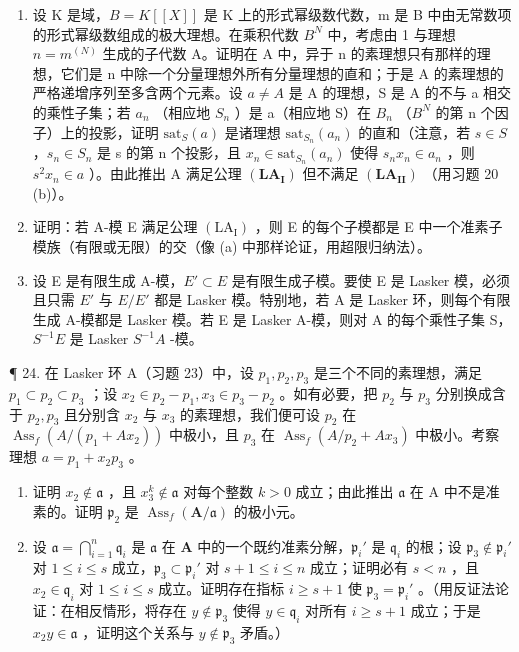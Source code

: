 \begin{enumerate}
\def\labelenumi{(\alph{enumi})}
\setcounter{enumi}{2}
\item
  设 K 是域，\(B = K[[X]]\) 是 K 上的形式幂级数代数，m 是 B 中由无常数项的形式幂级数组成的极大理想。在乘积代数 \(B^{N}\) 中，考虑由 1 与理想 \(n = m^{(N)}\) 生成的子代数 A。证明在 A 中，异于 n 的素理想只有那样的理想，它们是 n 中除一个分量理想外所有分量理想的直和；于是 A 的素理想的严格递增序列至多含两个元素。设 \(a \neq A\) 是 A 的理想，S 是 A 的不与 a 相交的乘性子集；若 \(a_{n}\) （相应地 \(S_{n}\) ）是 a（相应地 S）在 \(B_{n}\) （\(B^{N}\) 的第 n 个因子）上的投影，证明 \(\text{sat}_{S}(a)\) 是诸理想 \(\text{sat}_{S_{n}}(a_{n})\) 的直和（注意，若 \(s \in S\) ，\(s_{n} \in S_{n}\) 是 s 的第 n 个投影，且 \(x_{n} \in \text{sat}_{S_{n}}(a_{n})\) 使得 \(s_{n}x_{n} \in a_{n}\) ，则 \(s^{2}x_{n} \in a\) ）。由此推出 A 满足公理 \((\mathbf{LA}_{\mathbf{I}})\) 但不满足 \((\mathbf{LA}_{\mathbf{II}})\) （用习题 20 (b)）。
\item
  证明：若 A-模 E 满足公理 \((\mathrm{LA}_{\mathrm{I}})\) ，则 E 的每个子模都是 E 中一个准素子模族（有限或无限）的交（像 (a) 中那样论证，用超限归纳法）。
\item
  设 E 是有限生成 A-模，\(E' \subset E\) 是有限生成子模。要使 E 是 Lasker 模，必须且只需 \(E'\) 与 \(E/E'\) 都是 Lasker 模。特别地，若 A 是 Lasker 环，则每个有限生成 A-模都是 Lasker 模。若 E 是 Lasker A-模，则对 A 的每个乘性子集 S，\(S^{-1}E\) 是 Lasker \(S^{-1}A\) -模。
\end{enumerate}

¶ 24. 在 Lasker 环 A（习题 23）中，设 \(p_1, p_2, p_3\) 是三个不同的素理想，满足 \(p_1 \subset p_2 \subset p_3\) ；设 \(x_2 \in p_2 - p_1, x_3 \in p_3 - p_2\) 。如有必要，把 \(p_2\) 与 \(p_3\) 分别换成含于 \(p_2, p_3\) 且分别含 \(x_2\) 与 \(x_3\) 的素理想，我们便可设 \(p_2\) 在 \(\operatorname{Ass}_f(A / (p_1 + Ax_2))\) 中极小，且 \(p_3\) 在 \(\operatorname{Ass}_f(A / p_2 + Ax_3)\) 中极小。考察理想 \(a = p_1 + x_2p_3\) 。

\begin{enumerate}
\def\labelenumi{(\alph{enumi})}
\item
  证明 \(x_{2} \notin \mathfrak{a}\) ，且 \(x_{3}^{k} \notin \mathfrak{a}\) 对每个整数 \(k > 0\) 成立；由此推出 \(\mathfrak{a}\) 在 A 中不是准素的。证明 \(\mathfrak{p}_{2}\) 是 \(\operatorname{Ass}_f(\mathbf{A} / \mathfrak{a})\) 的极小元。
\item
  设 \(\mathfrak{a} = \bigcap_{i=1}^{n} \mathfrak{q}_i\) 是 \(\mathfrak{a}\) 在 \(\mathbf{A}\) 中的一个既约准素分解，\(\mathfrak{p}_i'\) 是 \(\mathfrak{q}_i\) 的根；设 \(\mathfrak{p}_3 \notin \mathfrak{p}_i'\) 对 \(1 \leqslant i \leqslant s\) 成立，\(\mathfrak{p}_3 \subset \mathfrak{p}_i'\) 对 \(s + 1 \leqslant i \leqslant n\) 成立；证明必有 \(s < n\) ，且 \(x_2 \in \mathfrak{q}_i\) 对 \(1 \leqslant i \leqslant s\) 成立。证明存在指标 \(i \geqslant s + 1\) 使 \(\mathfrak{p}_3 = \mathfrak{p}_i'\) 。（用反证法论证：在相反情形，将存在 \(y \notin \mathfrak{p}_3\) 使得 \(y \in \mathfrak{q}_i\) 对所有 \(i \geqslant s + 1\) 成立；于是 \(x_2y \in \mathfrak{a}\) ，证明这个关系与 \(y \notin \mathfrak{p}_3\) 矛盾。）
\end{enumerate}

